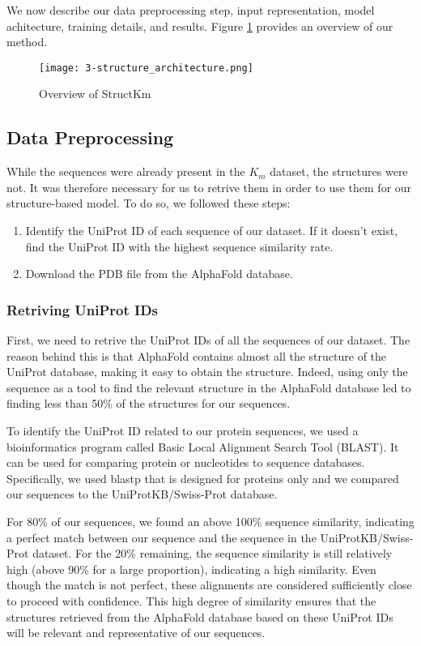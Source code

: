 We now describe our data preprocessing step, input representation, model achitecture, training details, and results. 
Figure \ref{fig:structkm} provides an overview of our method.

\begin{figure}
  \centering
  \texttt{[image: 3-structure\_architecture.png]}
  \caption{Overview of StructKm}
  \label{fig:structkm}
\end{figure}

\subsection{Data Preprocessing}

While the sequences were already present in the $K_m$ dataset, the structures were not. It was therefore necessary
for us to retrive them in order to use them for our structure-based model. To do so, we followed these steps:
\begin{enumerate}
  \item Identify the UniProt ID of each sequence of our dataset. If it doesn't exist, find the UniProt ID with the 
  highest sequence similarity rate.
  \item Download the PDB file from the AlphaFold database.
\end{enumerate}

\subsubsection{Retriving UniProt IDs}
First, we need to retrive the UniProt IDs of all the sequences of our dataset. The reason behind this is that
AlphaFold contains almost all the structure of the UniProt database, making it easy to obtain the structure.
Indeed, using only the sequence as a tool to find the relevant structure in the AlphaFold database led to finding
less than 50\% of the structures for our sequences.

To identify the UniProt ID related to our protein sequences, we used a bioinformatics program called Basic Local Alignment Search Tool (BLAST). It can be used for comparing protein or nucleotides to sequence databases. Specifically, we used blastp that is designed for proteins only and we compared our sequences to the UniProtKB/Swiss-Prot database. 

For 80\% of our sequences, we found an above 100\% sequence similarity, indicating a perfect match between our
sequence and the sequence in the UniProtKB/Swiss-Prot dataset. For the 20\% remaining, the sequence similarity is
still relatively high (above 90\% for a large proportion), indicating a high similarity. Even though the match is
not perfect, these alignments are considered sufficiently close to proceed with confidence. This high degree of similarity ensures that the structures retrieved from the AlphaFold database based on these UniProt IDs will be relevant and representative of our sequences.

